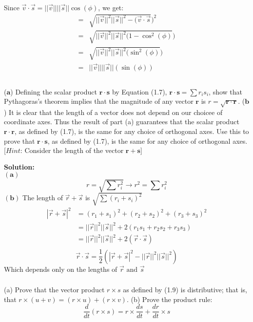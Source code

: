 \documentclass{article}
\newcommand\Problem{%
    \subsubsection{}%
}
\newcommand\TheSolution{%
  \textbf{Solution:}\\%
}
\begin{document}
Since $\vec{v} \cdot \vec{s} = ||\vec{v}||||\vec{s}||\cos(\phi)$, we get:
\begin{equation}
    \begin{aligned}
        = & \sqrt{||\vec{v}||^2||\vec{s}||^2 - (\vec{v} \cdot \vec{s}})^2 \\
        = & \sqrt{||\vec{v}||^2||\vec{s}||^2(1 - \cos^2(\phi)})           \\
        = & \sqrt{||\vec{v}||^2||\vec{s}||^2(\sin^2(\phi)})               \\
        = & \boxed{||\vec{v}||||\vec{s}||(\sin(\phi))}                    \\
    \end{aligned}
\end{equation}

\Problem ($\textbf{a}$) Defining the scalar product $\pmb{r \cdot s}$ by Equation (1.7), $\pmb{r \cdot s} = \sum r_i s_i$, show that Pythagoras's theorem implies that the magnitude of any vector $\textbf{r}$ is $\textit{r} = \sqrt{\pmb{r \cdot r}}$. ($\textbf{b}$) It is clear that the length of a vector does not depend on our choicee of coordinate axes. Thus the result of part (a) guarantees that the scalar product $\pmb{r \cdot r}$, as defined by (1.7), is the same for any choice of orthogonal axes. Use this to prove that $\pmb{r \cdot s}$, as defined by (1.7), is the same for any choice of orthogonal axes. [$\textit{Hint:}$ Consider the length of the vector $\pmb{r + s}$]

\TheSolution
$(\textbf{a})$ \[\textit{r} = \sqrt{\sum r_i^2} \rightarrow \textit{r}^2 = \sum r_i^2\]
$(\textbf{b})$ The length of $\vec{r} + \vec{s}$ is  $\sqrt{\sum (r_i + s_i)^2}$
\begin{equation}
    \begin{aligned}
        |\vec{r} + \vec{s}|^2 & = (r_1 + s_1)^2 + (r_2 + s_2)^2 + (r_3 + s_3)^2               \\
                              & = ||\vec{r}||^2||\vec{s}||^2 + 2(r_1 s_1 + r_2 s_2 + r_3 s_3) \\
                              & = ||\vec{r}||^2||\vec{s}||^2 + 2(\vec{r} \cdot \vec{s})       \\
    \end{aligned}
\end{equation}
\[\boxed{\vec{r} \cdot \vec{s} = \frac{1}{2}(|\vec{r} + \vec{s}|^2 - ||\vec{r}||^2||\vec{s}||^2)}\]
Which depends only on the lengths of $\vec{r} \text{ and } \vec{s}$


\Problem (a) Prove that the vector product $r \times s$ as defined by (1.9) is distributive; that is, that $r \times (u + v) = (r \times u) + (r \times v)$. (b) Prove the product rule:
\[ \frac{d}{dt} (r \times s) = r \times \frac{ds}{dt} + \frac{dr}{dt} \times s  \]
\end{document}
